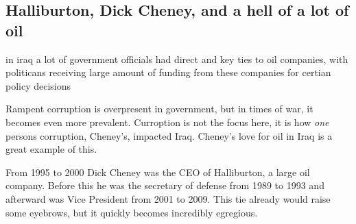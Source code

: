 \documentclass{article}
\begin{document}


    \subsection{Halliburton, Dick Cheney, and a hell of a lot of oil}
        in iraq a lot of government officials had direct and key ties to oil companies, with politicans receiving large amount of funding from these companies for certian policy decisions

        Rampent corruption is overpresent in government, but in times of war, it becomes even more prevalent. Curroption is not the focus here, it is how \textit{one} persons corruption, Cheney's, impacted Iraq. Cheney's love for oil in Iraq is a great example of this.

        From 1995 to 2000 Dick Cheney was the CEO of Halliburton, a large oil company. Before this he was the secretary of defense from 1989 to 1993 and afterward was Vice President from 2001 to 2009. This tie already would raise some eyebrows, but it quickly becomes incredibly egregious. 
        
\end{document}
